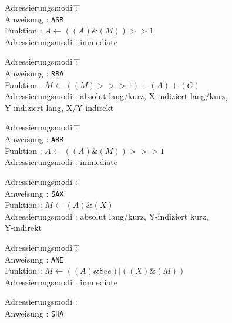 \documentclass[12pt,a4paper,twoside]{report}
\newcommand{\tty}[1]{{\tt #1}}
\begin{document}
{\begin{tabbing}
Adressierungsmodi \= : \= \kill \\
Anweisung         \> : \> \tty{ASR} \\
Funktion          \> : \> $A\leftarrow((A)\&(M))>>1$ \\
Adressierungsmodi \> : \> immediate \\
\end{tabbing}
\begin{tabbing}
Adressierungsmodi \= : \= \kill \\
Anweisung         \> : \> \tty{RRA} \\
Funktion          \> : \> $M\leftarrow((M)>>>1)+(A)+(C)$ \\
Adressierungsmodi \> : \> absolut lang/kurz, X-indiziert lang/kurz, \\
                  \>   \> Y-indiziert lang, X/Y-indirekt \\
\end{tabbing}
\begin{tabbing}
Adressierungsmodi \= : \= \kill \\
Anweisung         \> : \> \tty{ARR} \\
Funktion          \> : \> $A\leftarrow((A)\&(M))>>>1$ \\
Adressierungsmodi \> : \> immediate \\
\end{tabbing}
\begin{tabbing}
Adressierungsmodi \= : \= \kill \\
Anweisung         \> : \> \tty{SAX} \\
Funktion          \> : \> $M\leftarrow(A)\&(X)$ \\
Adressierungsmodi \> : \> absolut lang/kurz, Y-indiziert kurz, \\
                  \>   \> Y-indirekt \\
\end{tabbing}
\begin{tabbing}
Adressierungsmodi \= : \= \kill \\
Anweisung         \> : \> \tty{ANE} \\
Funktion          \> : \> $M\leftarrow((A)\&\$ee)|((X)\&(M))$ \\
Adressierungsmodi \> : \> immediate \\
\end{tabbing}
\begin{tabbing}
Adressierungsmodi \= : \= \kill \\
Anweisung         \> : \> \tty{SHA} \\

\end{tabbing}}
\end{document}
